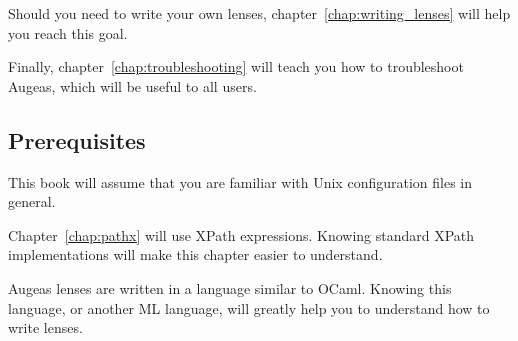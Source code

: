 Should you need to write your own lenses, chapter~\ref{chap:writing_lenses} will help you reach this goal.

Finally, chapter~\ref{chap:troubleshooting} will teach you how to troubleshoot Augeas, which will be useful to all users.


\subsection{Prerequisites}

This book will assume that you are familiar with Unix configuration files in general.

Chapter~\ref{chap:pathx} will use XPath expressions. Knowing standard XPath implementations will make this chapter easier to understand.

Augeas lenses are written in a language similar to OCaml. Knowing this language, or another ML language, will greatly help you to understand how to write lenses.





